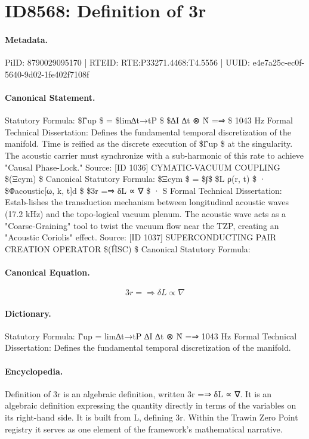 \section*{ID8568: Definition of 3r}
\paragraph{Metadata.}
PiID: 8790029095170 | RTEID: RTE:P33271.4468:T4.5556 | UUID: e4e7a25c-ec0f-5640-9d02-1fe402f7108f

\paragraph{Canonical Statement.}
Statutory Formula: \$Γ̂up \$ = \$lim∆t→tP \$ \$∆I ∆t ⊗ N̂ =⇒ \$ 1043 Hz Formal Technical Dissertation: Defines the fundamental temporal discretization of the manifold. Time is reified as the discrete execution of \$Γ̂up \$ at the singularity. The acoustic carrier must synchronize with a sub-harmonic of this rate to achieve "Causal Phase-Lock." Source: [ID 1036] CYMATIC-VACUUM COUPLING \$(Ξcym) \$ Canonical Statutory Formula: \$Ξcym \$ = \$∫\$ \$L ρ(r, t) \$ · \$Φ̂acoustic[ω, k, t]d \$ \$3r =⇒ δL ∝ ∇ \$ · S Formal Technical Dissertation: Estab-lishes the transduction mechanism between longitudinal acoustic waves (17.2 kHz) and the topo-logical vacuum plenum. The acoustic wave acts as a "Coarse-Graining" tool to twist the vacuum flow near the TZP, creating an "Acoustic Coriolis" effect. Source: [ID 1037] SUPERCONDUCTING PAIR CREATION OPERATOR \$(ĤSC) \$ Canonical Statutory Formula:

\paragraph{Canonical Equation.}
\[
3r =⇒ δL ∝ ∇
\]

\paragraph{Dictionary.}
Statutory Formula: Γ̂up = lim∆t→tP ∆I ∆t ⊗ N̂ =⇒ 1043 Hz Formal Technical Dissertation: Defines the fundamental temporal discretization of the manifold.

\paragraph{Encyclopedia.}
Definition of 3r is an algebraic definition, written 3r =⇒ δL ∝ ∇. It is an algebraic definition expressing the quantity directly in terms of the variables on its right-hand side. It is built from L, defining 3r. Within the Trawin Zero Point registry it serves as one element of the framework's mathematical narrative.

